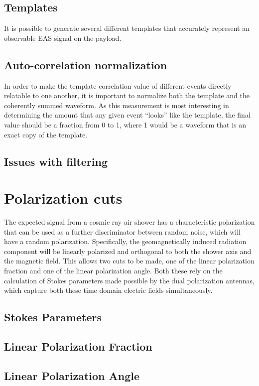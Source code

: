 	\subsection{Templates}
		It is possible to generate several different templates that accurately represent an observable EAS signal on the payload.
	
	\subsection{Auto-correlation normalization}
		In order to make the template correlation value of different events directly relatable to one another, it is important to normalize both the template and the coherently summed waveform.  As this measurement is most interesting in determining the amount that any given event ``looks'' like the template, the final value should be a fraction from 0 to 1, where 1 would be a waveform that is an exact copy of the template.  

	\subsection{Issues with filtering}


\section{Polarization cuts}
	The expected signal from a cosmic ray air shower has a characteristic polarization that can be used as a further discriminator between random noise, which will have a random polarization.  Specifically, the geomagnetically induced radiation component will be linearly polarized and orthogonal to both the shower axis and the magnetic field.  This allows two cuts to be made, one of the linear polarization fraction and one of the linear polarization angle.  Both these rely on the calculation of Stokes parameters made possible by the dual polarization antennas, which capture both these time domain electric fields simultaneously.

	\subsection{Stokes Parameters}

	\subsection{Linear Polarization Fraction}
		
	\subsection{Linear Polarization Angle}

